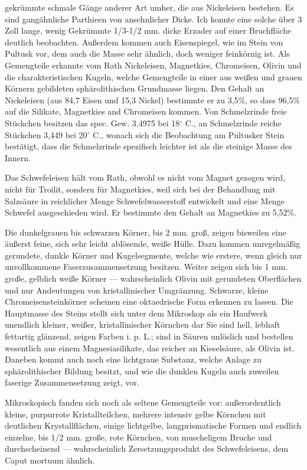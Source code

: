 \documentclass[a4paper, 11pt, oneside]{article}
\begin{document}
gekrümmte schmale Gänge anderer Art umher, die aus Nickeleisen bestehen. Es sind gangähnliche Parthieen von ansehnlicher Dicke. Ich konnte eine solche über 3 Zoll lange, wenig Gekrümmte 1/3-1/2 mm. dicke Erzader auf einer Bruchfläche deutlich beobachten. Außerdem kommen auch Eisenspiegel, wie im Stein von Pultusk vor, dem auch die Masse sehr ähnlich, doch weniger feinkörnig ist. Als Gemengteile erkannte vom Rath Nickeleisen, Magnetkies, Chromeisen, Olivin und die charakteristischen Kugeln, welche Gemengteile in einer aus weißen und grauen Körnern gebildeten sphärolithischen Grundmasse liegen. Den Gehalt an Nickeleisen (aus 84,7 Eisen und 15,3 Nickel) bestimmte er zu 3,5\%, so dass 96,5\% auf die Silikate, Magnetkies and Chromeisen kommen. Von Schmelzrinde freie Stückchen besitzen das spec. Gew. 3,4975 bei 18$^{\circ}$ C., an Schmelzrinde reiche Stückchen 3,449 bei 20$^{\circ}$ C., wonach sich die Beobachtung am Pultusker Stein bestätigt, dass die Schmelzrinde spezifisch leichter ist als die steinige Masse des Innern.

Das Schwefeleisen hält vom Rath, obwohl es nicht vom Magnet gezogen wird, nicht für Troilit, sondern für Magnetkies, weil sich bei der Behandlung mit Salzsäure in reichlicher Menge Schwefelwasserstoff entwickelt und eine Menge Schwefel ausgeschieden wird. Er bestimmte den Gehalt an Magnetkies zu 5,52\%.

Die dunkelgrauen bis schwarzen Körner, bis 2 mm. groß, zeigen bisweilen eine äußerst feine, sich sehr leicht ablösende, weiße Hülle. Dazu kommen unregelmäßig gerundete, dunkle Körner und Kugelsegmente, welche wie erstere, wenn gleich nur unvollkommene Faserzusammensetzung besitzen. Weiter zeigen sich bis 1 mm. große, gelblich weiße Körner — wahrscheinlich Olivin mit gerundeten Oberflächen und nur Andeutungen von kristallinischer Umgränzung. Schwarze, kleine Chromeisensteinkörner scheinen eine oktaedrische Form erkennen zu lassen. Die Hauptmasse des Steins stellt sich unter dem Mikroskop als ein Haufwerk unendlich kleiner, weißer, kristallinischer Körnchen dar Sie sind hell, lebhaft fettartig glänzend, zeigen Farben i. p. L.; sind in Säuren unlöslich und bestellen wesentlich aus einem Magnesiasilikate, das reicher an Kieselsäure, als Olivin ist. Daneben kommt auch noch eine lichtgraue Substanz, welche Anlage zu sphärolithischer Bildung besitzt, und wie die dunklen Kugeln auch zuweilen faserige Zusammensetzung zeigt, vor.

Mikroskopisch fanden sich noch als seltene Gemengteile vor: außerordentlich kleine, purpurrote Kristallteilchen, mehrere intensiv gelbe Körnchen mit deutlichen Krystallflächen, einige lichtgelbe, langprismatische Formen und endlich einzelne, bis 1/2 mm. große, rote Körnchen, von muscheligem Bruche und durchscheinend — wahrscheinlich Zersetzungsprodukt des Schwefeleisens, dem Caput mortuum ähnlich.
\end{document}
